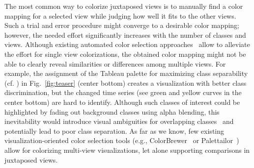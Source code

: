 The most common way to colorize juxtaposed views is to manually find a color mapping for a    selected view while judging how well it fits to the other views. Such a trial and error procedure might converge to a desirable color mapping; however, the needed effort significantly increases with the number of classes and views. %
Although existing automated color selection approaches~\cite{Chen14,Wang2018,Lu21} allow to alleviate the effort for single view colorizations, the obtained color mapping might not be able to clearly reveal similarities or differences among multiple views. For example, the assignment of the Tableau palette for maximizing class separability (cf. \cite{Wang2018}) in Fig.~\ref{fig:teaser} (center bottom) creates a visualization with better class discrimination, but the changed time series (see green and yellow curves in the center bottom) are hard to identify.
Although such classes of interest could be highlighted by fading out background classes using alpha blending, this  inevitability would introduce visual ambiguities for overlapping classes~\cite{baudisch2004multiblending} and potentially lead to poor class separation.
As far as we know, few existing visualization-oriented color selection tools (e.g., ColorBrewer~\cite{harrower2003colorbrewer} or Palettailor~\cite{Lu21}) allow for colorizing multi-view visualizations, let alone supporting comparisons in juxtaposed views.




